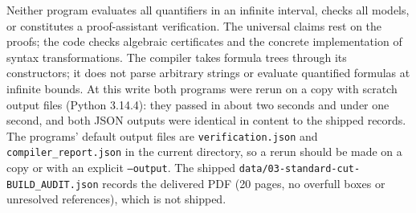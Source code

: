 \documentclass[11pt]{article}
\theoremstyle{definition}
\theoremstyle{remark}
\newcommand{\fn}[1]{\nolinkurl{#1}}
\begin{document}
Neither program evaluates all quantifiers in an infinite interval, checks
all models, or constitutes a proof-assistant verification. The universal
claims rest on the proofs; the code checks algebraic certificates and the
concrete implementation of syntax transformations. The compiler takes
formula trees through its constructors; it does not parse arbitrary
strings or evaluate quantified formulas at infinite bounds. At this write
both programs were rerun on a copy with scratch output files (Python
3.14.4): they passed in about two seconds and under one second, and both
JSON outputs were identical in content to the shipped records. The
programs' default output files are \fn{verification.json} and
\fn{compiler_report.json} in the current directory, so a rerun should be
made on a copy or with an explicit \texttt{--output}. The shipped
\fn{data/03-standard-cut-BUILD_AUDIT.json} records the delivered PDF (20
pages, no overfull boxes or unresolved references), which is not shipped.
\end{document}

